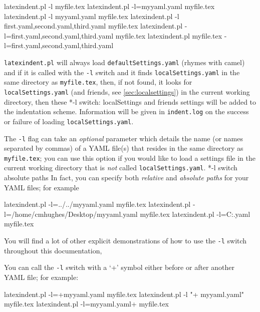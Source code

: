  \begin{commandshell}
latexindent.pl -l myfile.tex
latexindent.pl -l=myyaml.yaml myfile.tex
latexindent.pl -l myyaml.yaml myfile.tex
latexindent.pl -l first.yaml,second.yaml,third.yaml myfile.tex
latexindent.pl -l=first.yaml,second.yaml,third.yaml myfile.tex
latexindent.pl myfile.tex -l=first.yaml,second.yaml,third.yaml 
\end{commandshell}

 \label{page:localswitch}
 \texttt{latexindent.pl} will always load \texttt{defaultSettings.yaml} (rhymes with
 camel) and if it is called with the \texttt{-l} switch and it finds
 \texttt{localSettings.yaml} in the same directory as \texttt{myfile.tex}, then, if not
 found, it looks for \texttt{localSettings.yaml} (and friends, see
 \vref{sec:localsettings}) in the current working directory, then
 these%
 *{-l switch: localSettings and
 friends} settings will be added to the indentation scheme. Information will be given in
 \texttt{indent.log} on the success or failure of loading \texttt{localSettings.yaml}.

 The \texttt{-l} flag can take an \emph{optional} parameter which details the name (or
 names separated by commas) of a YAML file(s) that resides in the same directory as
 \texttt{myfile.tex}; you can use this option if you would like to load a settings file
 in the current working directory that is \emph{not} called \texttt{localSettings.yaml}.
 *{-l switch absolute paths} In fact, you can specify both
 \emph{relative} and \emph{absolute paths} for your YAML files; for example%

 \begin{commandshell}
latexindent.pl -l=../../myyaml.yaml myfile.tex
latexindent.pl -l=/home/cmhughes/Desktop/myyaml.yaml myfile.tex
latexindent.pl -l=C:\Users\cmhughes\Desktop\myyaml.yaml myfile.tex
\end{commandshell}

 You will find a lot of other explicit demonstrations of how to use the \texttt{-l}
 switch throughout this documentation,

 You can call the \texttt{-l} switch with a `+' symbol either before or after
  another YAML file; for example:

 \begin{commandshell}
latexindent.pl -l=+myyaml.yaml myfile.tex
latexindent.pl -l "+ myyaml.yaml" myfile.tex
latexindent.pl -l=myyaml.yaml+  myfile.tex
\end{commandshell}

